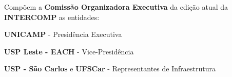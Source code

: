 
\begin{article}
	\label{art:comissao}
	Compõem a \textbf{Comissão Organizadora Executiva} da edição atual da \textbf{INTERCOMP} as entidades:
	\begin{description}[noitemsep]
		\item \textbf{UNICAMP} - Presidência Executiva
		\item \textbf{USP Leste - EACH} - Vice-Presidência
		\item \textbf{USP - São Carlos} e \textbf{UFSCar} - Representantes de Infraestrutura
	\end{description}
\end{article}

